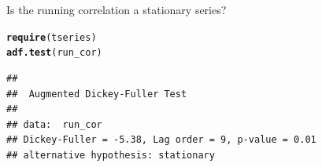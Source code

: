 \documentclass[10pt]{article}\usepackage[]{graphicx}\usepackage[]{color}
\makeatletter
\newcommand{\hlstd}[1]{\textcolor[rgb]{0.345,0.345,0.345}{#1}}%
\newcommand{\hlkwd}[1]{\textcolor[rgb]{0.737,0.353,0.396}{\textbf{#1}}}%
\newenvironment{kframe}{%
 \def\at@end@of@kframe{}%
 \ifinner\ifhmode%
  \def\at@end@of@kframe{\end{minipage}}%
  \begin{minipage}{\columnwidth}%
 \fi\fi%
 \def\FrameCommand##1{\hskip\@totalleftmargin \hskip-\fboxsep
 \colorbox{shadecolor}{##1}\hskip-\fboxsep
     \hskip-\linewidth \hskip-\@totalleftmargin \hskip\columnwidth}%
 \MakeFramed {\advance\hsize-\width
   \@totalleftmargin\z@ \linewidth\hsize
   \@setminipage}}%
 {\par\unskip\endMakeFramed%
 \at@end@of@kframe}
\newenvironment{knitrout}{}{} %
\makeatother
\begin{document}
Is the running correlation a stationary series?
\begin{knitrout}
\color{fgcolor}\begin{kframe}
\begin{alltt}
\hlkwd{require}\hlstd{(tseries)}
\hlkwd{adf.test}\hlstd{(run_cor)}
\end{alltt}


{\ttfamily\noindent\color{warningcolor}{\#\# Warning: p-value smaller than printed p-value}}\begin{verbatim}
## 
## 	Augmented Dickey-Fuller Test
## 
## data:  run_cor
## Dickey-Fuller = -5.38, Lag order = 9, p-value = 0.01
## alternative hypothesis: stationary
\end{verbatim}
\end{kframe}
\end{knitrout}
\end{document}
